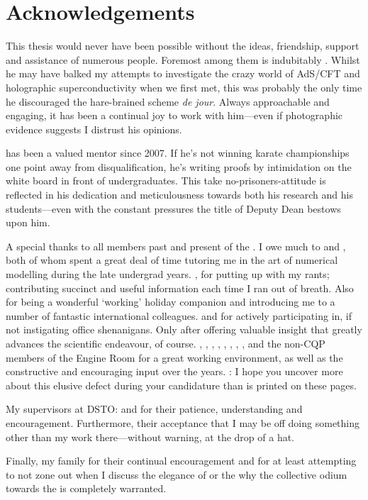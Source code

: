 \chapter{Acknowledgements}

\vspace{-1.2cm}

This thesis would never have been possible without the ideas, friendship, support and assistance of numerous people.
Foremost among them is indubitably .
Whilst he may have balked my attempts to investigate the crazy world of AdS/CFT and holographic superconductivity when we first met, this was probably the only time he discouraged the hare-brained scheme \emph{de jour}.
Always approachable and engaging, it has been a continual joy to work with him---even if photographic evidence suggests I distrust his opinions.

 has been a valued mentor since 2007.
If he's not winning karate championships one point away from disqualification, he's writing proofs by intimidation on the white board in front of undergraduates.
This take no-prisoners-attitude is reflected in his dedication and meticulousness towards both his research and his students---even with the constant pressures the title of Deputy Dean bestows upon him.

A special thanks to all members past and present of the .
I owe much to  and , both of whom spent a great deal of time tutoring me in the art of numerical modelling during the late undergrad years.
, for putting up with my rants; contributing succinct and useful information each time I ran out of breath.
Also for being a wonderful `working' holiday companion and introducing me to a number of fantastic international colleagues.
 and  for actively participating in, if not instigating office shenanigans.
Only after offering valuable insight that greatly advances the scientific endeavour, of course.
, , , , , , , ,  and the non-CQP members of the Engine Room for a great working environment, as well as the constructive and encouraging input over the years.
: I hope you uncover more about this elusive defect during your candidature than is printed on these pages.

My supervisors at DSTO: %
%
 and  for their patience, understanding and encouragement.
Furthermore, their acceptance that I may be off doing something other than my work there---without warning, at the drop of a hat.

Finally, my family for their continual encouragement and for at least attempting to not zone out when I discuss the elegance of  or the why the collective odium towards the  is completely warranted.


